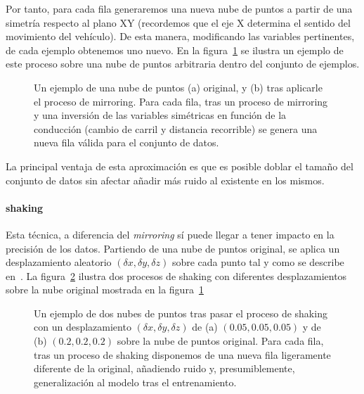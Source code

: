 Por tanto, para cada fila generaremos una nueva nube de puntos a partir de una simetría respecto al plano XY (recordemos que el eje X determina el sentido del movimiento del vehículo). De esta manera, modificando las variables pertinentes, de cada ejemplo obtenemos uno nuevo. En la figura~\ref{fig:mirroring-example} se ilustra un ejemplo de este proceso sobre una nube de puntos arbitraria dentro del conjunto de ejemplos.

\begin{figure}
	\centering
	\qquad
	\caption[Ejemplo de la técnica de \textit{mirroring}]{Un ejemplo de una nube de puntos (a) original, y (b) tras aplicarle el proceso de mirroring. Para cada fila, tras un proceso de mirroring y una inversión de las variables simétricas en función de la conducción (cambio de carril y distancia recorrible) se genera una nueva fila válida para el conjunto de datos.}
	\label{fig:mirroring-example}
\end{figure}

La principal ventaja de esta aproximación es que es posible doblar el tamaño del conjunto de datos sin afectar añadir más ruido al existente en los mismos.

\paragraph{shaking}

Esta técnica, a diferencia del \textit{mirroring} sí puede llegar a tener impacto en la precisión de los datos. Partiendo de una nube de puntos original, se aplica un desplazamiento aleatorio $(\delta x, \delta y, \delta z)$ sobre cada punto tal y como se describe en~\cite{EL PAPER CUANDO NOS LO PUBLIQUEN}. La figura~\ref{fig:shaking-example} ilustra dos procesos de shaking con diferentes desplazamientos sobre la nube original mostrada en la figura~\ref{fig:mirroring-example}

\begin{figure}
	\centering
	\qquad
	\caption[Ejemplo de la técnica de \textit{shaking}]{Un ejemplo de dos nubes de puntos tras pasar el proceso de shaking con un desplazamiento $(\delta x, \delta y, \delta z)$ de (a) $(0.05, 0.05, 0.05)$ y de (b) $(0.2, 0.2, 0.2)$ sobre la nube de puntos original. Para cada fila, tras un proceso de shaking disponemos de una nueva fila ligeramente diferente de la original, añadiendo ruido y, presumiblemente, generalización al modelo tras el entrenamiento.}
	\label{fig:shaking-example}
\end{figure}

